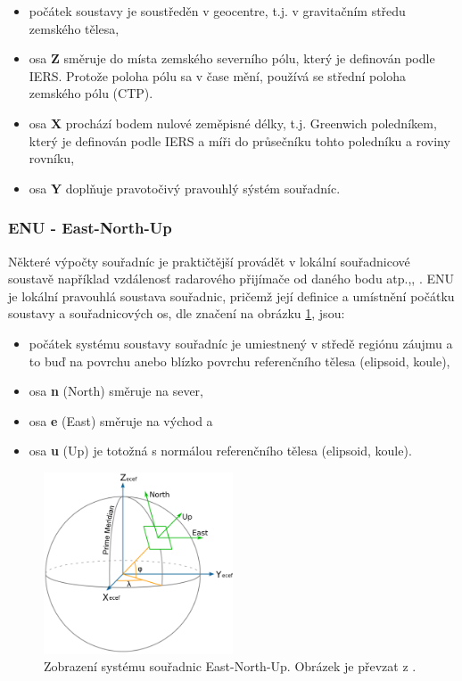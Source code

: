 \begin{itemize}
\item počátek soustavy je soustředěn v geocentre, t.j. v gravitačním středu zemského tělesa,
\item osa \textbf{Z} směruje do místa zemského severního pólu, který je definován podle IERS. Protože poloha pólu sa v čase mění, používá se střední poloha zemského pólu (CTP).
\item osa \textbf{X} prochází bodem nulové zeměpisné délky, t.j. Greenwich poledníkem, který je definován podle IERS a míři do průsečníku tohto poledníku a roviny rovníku,
\item osa \textbf{Y} doplňuje pravotočivý pravouhlý sýstém souřadníc.
\end{itemize}

\subsubsection{ENU - East-North-Up}

Některé výpočty souřadníc je praktičtější provádět v lokální souřadnicové soustavě například vzdálenosť radarového přijímače od daného bodu atp.,\cite{Kovar2016}, \cite{Mayer2002}. ENU je lokální pravouhlá soustava souřadnic, pričemž její definice a umístnění počátku soustavy a souřadnicových os, dle značení na obrázku \ref{fig:enu}, jsou:
 
\begin{itemize}
\item počátek systému soustavy souřadníc je umiestnený v středě regiónu záujmu a to  buď na povrchu anebo blízko povrchu referenčního tělesa (elipsoid, koule),
\item osa \textbf{n} (North) směruje na sever, 
\item osa \textbf{e} (East) směruje na východ a 
\item osa \textbf{u} (Up) je totožná s normálou referenčního tělesa (elipsoid, koule). 
\end{itemize}

\begin{figure}[ht!]
\begin{center}

\includegraphics[width=0.50\textwidth]{FIG/enu_wiki}
\caption{Zobrazení systému souřadnic East-North-Up. Obrázek je převzat z \cite{enuWiki}.}
\label{fig:enu}
\end{center}
\end{figure}

